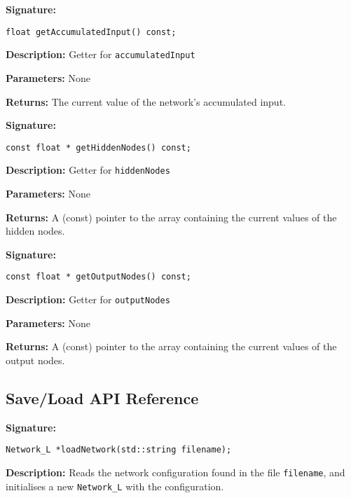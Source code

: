 \documentclass[a4paper]{article}
\begin{document}
\textbf{Signature:} \begin{lstlisting}
float getAccumulatedInput() const;
\end{lstlisting}

\textbf{Description: }
Getter for \lstinline{accumulatedInput}

\textbf{Parameters: } None

\textbf{Returns: }
The current value of the network's accumulated input.

\hrulefill %

\textbf{Signature:} \begin{lstlisting}
const float * getHiddenNodes() const;
\end{lstlisting}

\textbf{Description: }
Getter for \lstinline{hiddenNodes}

\textbf{Parameters: } None

\textbf{Returns: }
A (const) pointer to the array containing the current values of the hidden nodes.

\hrulefill %

\textbf{Signature:} \begin{lstlisting}
const float * getOutputNodes() const;
\end{lstlisting}

\textbf{Description: }
Getter for \lstinline{outputNodes}

\textbf{Parameters: } None

\textbf{Returns: }
A (const) pointer to the array containing the current values of the output nodes.

\hrulefill %

\newpage
\subsection{Save/Load API Reference}%
\label{subsec:dn_API_networksl}

\hrulefill %

\textbf{Signature:} \begin{lstlisting}
Network_L *loadNetwork(std::string filename);
\end{lstlisting}

\textbf{Description: }
Reads the network configuration found in the file \lstinline{filename}, and initialises a new \lstinline{Network_L} with the configuration.
\end{document}
